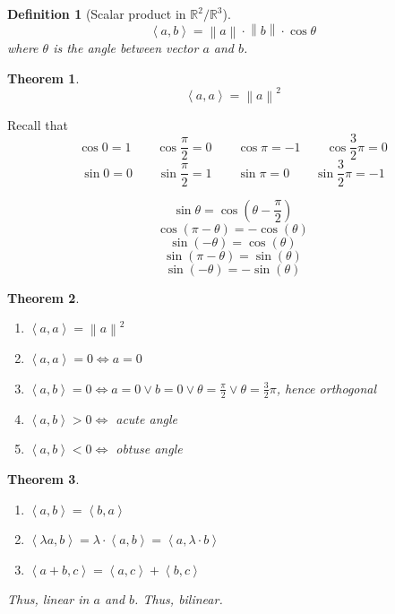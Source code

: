 \documentclass{article}
\newtheorem{theorem}{Theorem}  \numberwithin{theorem}{section}
\newtheorem{definition}{Definition}  \numberwithin{definition}{section}
\newcommand{\angel}[1]{\left\langle#1\right\rangle}
\newcommand{\norm}[1]{\left\|#1\right\|}
\begin{document}
\begin{definition}[Scalar product in $\mathbb R^2/\mathbb R^3$]
  \[ \angel{a, b} = \norm{a} \cdot \norm{b} \cdot \cos{\theta} \]
  where $\theta$ is the angle between vector $a$ and $b$.
\end{definition}

\begin{theorem}
  \[ \angel{a,a} = \norm{a}^2 \]
\end{theorem}

Recall that
\[ \cos{0} = 1 \qquad \cos{\frac\pi2} = 0 \qquad \cos{\pi} = -1 \qquad \cos{\frac32 \pi} = 0 \]
\[ \sin{0} = 0 \qquad \sin{\frac\pi2} = 1 \qquad \sin{\pi} = 0 \qquad \sin{\frac32 \pi} = -1 \]

\[ \sin\theta = \cos(\theta - \frac\pi2) \]
\[ \cos(\pi - \theta) = -\cos(\theta) \]
\[ \sin(-\theta) = \cos(\theta) \]
\[ \sin(\pi - \theta) = \sin(\theta) \]
\[ \sin(-\theta) = -\sin(\theta) \]

\begin{theorem} %
  \begin{enumerate}
    \item $\angel{a,a} = \norm{a}^2$
    \item $\angel{a,a} = 0 \iff a = 0$
    \item $\angel{a,b} = 0 \iff a = 0 \lor b = 0 \lor \theta = \frac\pi2 \lor \theta = \frac32 \pi$, hence orthogonal
    \item $\angel{a,b} > 0 \iff$ acute angle
    \item $\angel{a,b} < 0 \iff$ obtuse angle
  \end{enumerate}
\end{theorem}

\begin{theorem} %
  \label{satz83}
  \begin{enumerate}
    \item $\angel{a,b} = \angel{b,a}$
    \item $\angel{\lambda a, b} = \lambda \cdot \angel{a, b} = \angel{a, \lambda \cdot b}$
    \item $\angel{a+b, c} = \angel{a,c} + \angel{b, c}$
  \end{enumerate}
  Thus, linear in $a$ and $b$. Thus, bilinear.
\end{theorem}
\end{document}
